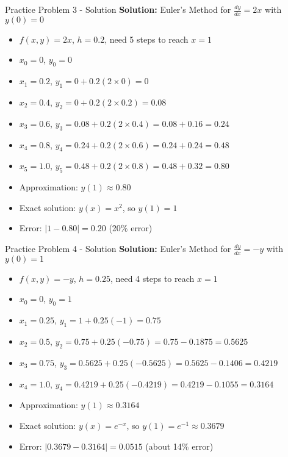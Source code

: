 \documentclass[aspectratio=169]{beamer}
\begin{document}
\begin{frame}{Practice Problem 3 - Solution}
\textbf{Solution:} Euler's Method for $\frac{dy}{dx} = 2x$ with $y(0) = 0$

\begin{itemize}
    \item $f(x,y) = 2x$, $h = 0.2$, need 5 steps to reach $x = 1$
    \item $x_0 = 0$, $y_0 = 0$
    \item $x_1 = 0.2$, $y_1 = 0 + 0.2(2 \times 0) = 0$
    \item $x_2 = 0.4$, $y_2 = 0 + 0.2(2 \times 0.2) = 0.08$
    \item $x_3 = 0.6$, $y_3 = 0.08 + 0.2(2 \times 0.4) = 0.08 + 0.16 = 0.24$
    \item $x_4 = 0.8$, $y_4 = 0.24 + 0.2(2 \times 0.6) = 0.24 + 0.24 = 0.48$
    \item $x_5 = 1.0$, $y_5 = 0.48 + 0.2(2 \times 0.8) = 0.48 + 0.32 = 0.80$
    \item Approximation: $y(1) \approx 0.80$
    \item Exact solution: $y(x) = x^2$, so $y(1) = 1$
    \item Error: $|1 - 0.80| = 0.20$ (20\% error)
\end{itemize}
\end{frame}

\begin{frame}{Practice Problem 4 - Solution}
\textbf{Solution:} Euler's Method for $\frac{dy}{dx} = -y$ with $y(0) = 1$

\begin{itemize}
    \item $f(x,y) = -y$, $h = 0.25$, need 4 steps to reach $x = 1$
    \item $x_0 = 0$, $y_0 = 1$
    \item $x_1 = 0.25$, $y_1 = 1 + 0.25(-1) = 0.75$
    \item $x_2 = 0.5$, $y_2 = 0.75 + 0.25(-0.75) = 0.75 - 0.1875 = 0.5625$
    \item $x_3 = 0.75$, $y_3 = 0.5625 + 0.25(-0.5625) = 0.5625 - 0.1406 = 0.4219$
    \item $x_4 = 1.0$, $y_4 = 0.4219 + 0.25(-0.4219) = 0.4219 - 0.1055 = 0.3164$
    \item Approximation: $y(1) \approx 0.3164$
    \item Exact solution: $y(x) = e^{-x}$, so $y(1) = e^{-1} \approx 0.3679$
    \item Error: $|0.3679 - 0.3164| = 0.0515$ (about 14\% error)
\end{itemize}
\end{frame}
\end{document}

